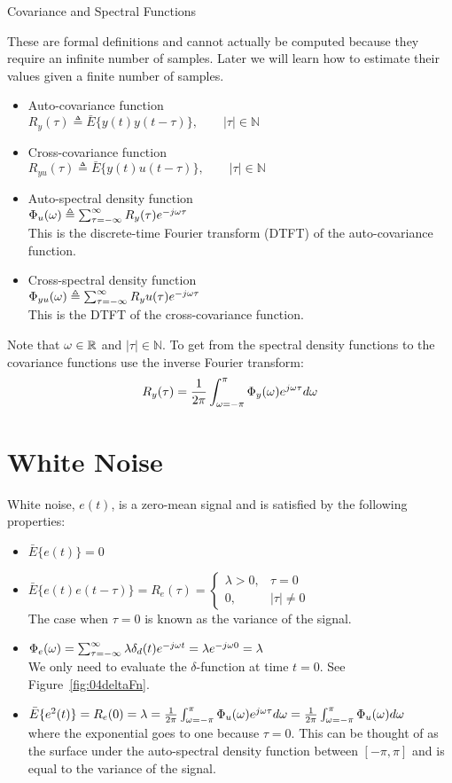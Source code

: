 \begin{definition}{Covariance and Spectral Functions}

These are formal definitions and cannot actually be computed because they require an infinite number of samples.
Later we will learn how to estimate their values given a finite number of samples.
\begin{itemize}
\item Auto-covariance function \\
$R_y(\tau) \triangleq \bar{E}\{y(t)y(t-\tau)\}, \qquad |\tau|\in\mathbb{N}$
\item Cross-covariance function \\
$R_{yu}(\tau) \triangleq \bar{E}\{y(t)u(t-\tau)\}, \qquad |\tau|\in\mathbb{N}$
\item Auto-spectral density function \\
$\Phi_u(\omega) \triangleq \sum_{\tau=-\infty}^\infty R_y(\tau)e^{-j\omega\tau}$ \\
This is the discrete-time Fourier transform (DTFT) of the auto-covariance function.
\item Cross-spectral density function \\
$\Phi_{yu}(\omega) \triangleq \sum_{\tau=-\infty}^\infty R_y u(\tau)e^{-j\omega\tau}$ \\
This is the DTFT of the cross-covariance function.
\end{itemize}
Note that $\omega\in\mathbb{R}$ and $|\tau|\in\mathbb{N}$.
To get from the spectral density functions to the covariance functions use the inverse Fourier transform:
$$R_y(\tau) = \frac{1}{2\pi}\int_{\omega=-\pi}^\pi \Phi_y(\omega)e^{j\omega\tau}d\omega$$
\end{definition}

\section{White Noise}
White noise, $e(t)$, is a zero-mean signal and is satisfied by the following properties:
\begin{itemize}
\item $\bar{E}\{e(t)\}=0$
\item $\bar{E}\{e(t)e(t-\tau)\} = R_e(\tau) = \begin{cases} \lambda>0, & \tau=0 \\ 0, & |\tau|\neq 0 \end{cases}$ \\
The case when $\tau=0$ is known as the variance of the signal.
\item $\Phi_e(\omega) = \sum_{\tau=-\infty}^\infty \lambda\delta_d(t)e^{-j\omega t} = \lambda e^{-j\omega 0} = \lambda$ \\
We only need to evaluate the $\delta$-function at time $t=0$.
See Figure~\ref{fig:04deltaFn}.
\item $\bar{E}\{e^2(t)\} = R_e(0) = \lambda = \frac{1}{2\pi}\int_{\omega=-\pi}^\pi\Phi_u(\omega)e^{j\omega\tau}d\omega = \frac{1}{2\pi} \int_{\omega=-\pi}^\pi\Phi_u(\omega)d\omega$ \\
where the exponential goes to one because $\tau=0$.
This can be thought of as the surface under the auto-spectral density function between $[-\pi,\pi]$ and is equal to the variance of the signal.
\end{itemize}

